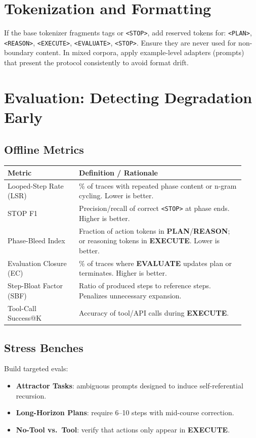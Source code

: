 \documentclass[11pt]{article}
\begin{document}
\section{Tokenization and Formatting}
If the base tokenizer fragments tags or \texttt{<STOP>}, add reserved tokens for:
\verb|<PLAN>|, \verb|<REASON>|, \verb|<EXECUTE>|, \verb|<EVALUATE>|, \verb|<STOP>|.
Ensure they are never used for non-boundary content. In mixed corpora,
apply example-level adapters (prompts) that present the protocol consistently to avoid format drift.

\section{Evaluation: Detecting Degradation Early}
\subsection{Offline Metrics}
\begin{table}[H]\centering
\begin{tabular}{p{0.28\linewidth} p{0.65\linewidth}}
\toprule
\textbf{Metric} & \textbf{Definition / Rationale} \\
\midrule
Looped-Step Rate (LSR) & \% of traces with repeated phase content or n-gram cycling. Lower is better. \\
STOP F1 & Precision/recall of correct \texttt{<STOP>} at phase ends. Higher is better. \\
Phase-Bleed Index & Fraction of action tokens in \textbf{PLAN}/\textbf{REASON}; or reasoning tokens in \textbf{EXECUTE}. Lower is better. \\
Evaluation Closure (EC) & \% of traces where \textbf{EVALUATE} updates plan or terminates. Higher is better. \\
Step-Bloat Factor (SBF) & Ratio of produced steps to reference steps. Penalizes unnecessary expansion. \\
Tool-Call Success@K & Accuracy of tool/API calls during \textbf{EXECUTE}. \\
\bottomrule
\end{tabular}
\end{table}

\subsection{Stress Benches}
Build targeted evals:
\begin{itemize}[leftmargin=2em]
  \item \textbf{Attractor Tasks}: ambiguous prompts designed to induce self-referential recursion.
  \item \textbf{Long-Horizon Plans}: require 6--10 steps with mid-course correction.
  \item \textbf{No-Tool vs.\ Tool}: verify that actions only appear in \textbf{EXECUTE}.
\end{itemize}
\end{document}

